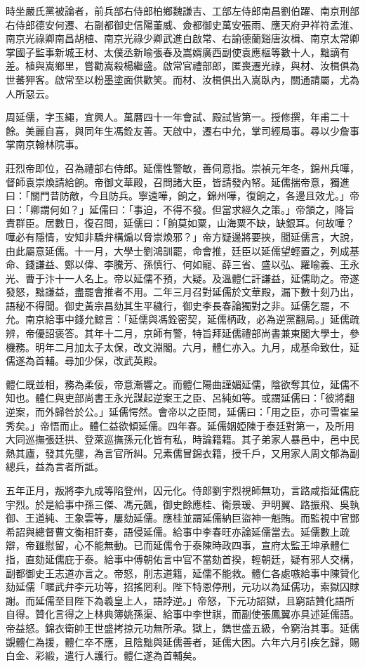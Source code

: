 \begin{pinyinscope}
時坐嚴氏黨被論者，前兵部右侍郎柏鄉魏謙吉、工部左侍郎南昌劉伯躍、南京刑部右侍郎德安何遷、右副都御史信陽董威、僉都御史萬安張雨、應天府尹祥符孟淮、南京光祿卿南昌胡植、南京光祿少卿武進白啟常、右諭德蘭谿唐汝楫、南京太常卿掌國子監事新城王材、太僕丞新喻張春及嵩婿廣西副使袁應樞等數十人，黜謫有差。植與嵩鄉里，嘗勸嵩殺楊繼盛。啟常官禮部郎，匿喪遷光祿，與材、汝楫俱為世蕃狎客。啟常至以粉墨塗面供歡笑。而材、汝楫俱出入嵩臥內，關通請屬，尤為人所惡云。

周延儒，字玉繩，宜興人。萬曆四十一年會試、殿試皆第一。授修撰，年甫二十餘。美麗自喜，與同年生馮銓友善。天啟中，遷右中允，掌司經局事。尋以少詹事掌南京翰林院事。

莊烈帝即位，召為禮部右侍郎。延儒性警敏，善伺意指。崇禎元年冬，錦州兵嘩，督師袁崇煥請給餉。帝御文華殿，召問諸大臣，皆請發內帑。延儒揣帝意，獨進曰：「關門昔防敵，今且防兵。寧遠嘩，餉之，錦州嘩，復餉之，各邊且效尤。」帝曰：「卿謂何如？」延儒曰：「事迫，不得不發。但當求經久之策。」帝頷之，降旨責群臣。居數日，復召問，延儒曰：「餉莫如粟，山海粟不缺，缺銀耳。何故嘩？嘩必有隱情，安知非驕弁構煽以脅崇煥邪？」帝方疑邊將要挾，聞延儒言，大說，由此屬意延儒。十一月，大學士劉鴻訓罷，命會推，廷臣以延儒望輕置之，列成基命、錢謙益、鄭以偉、李騰芳、孫慎行、何如寵、薛三省、盛以弘、羅喻義、王永光、曹于汴十一人名上。帝以延儒不預，大疑。及溫體仁訐謙益，延儒助之。帝遂發怒，黜謙益，盡罷會推者不用。二年三月召對延儒於文華殿，漏下數十刻乃出，語秘不得聞。御史黃宗昌劾其生平穢行，御史李長春論獨對之非。延儒乞罷，不允。南京給事中錢允鯨言：「延儒與馮銓密契，延儒柄政，必為逆黨翻局。」延儒疏辨，帝優詔褒答。其年十二月，京師有警，特旨拜延儒禮部尚書兼東閣大學士，參機務。明年二月加太子太保，改文淵閣。六月，體仁亦入。九月，成基命致仕，延儒遂為首輔。尋加少保，改武英殿。

體仁既並相，務為柔佞，帝意漸響之。而體仁陽曲謹媚延儒，陰欲奪其位，延儒不知也。體仁與吏部尚書王永光謀起逆案王之臣、呂純如等。或謂延儒曰：「彼將翻逆案，而外歸咎於公。」延儒愕然。會帝以之臣問，延儒曰：「用之臣，亦可雪崔呈秀矣。」帝悟而止。體仁益欲傾延儒。四年春。延儒姻婭陳于泰廷對第一，及所用大同巡撫張廷拱、登萊巡撫孫元化皆有私，時論籍籍。其子弟家人暴邑中，邑中民熱其廬，發其先壟，為言官所糾。兄素儒冒錦衣籍，授千戶，又用家人周文郁為副總兵，益為言者所詆。

五年正月，叛將李九成等陷登州，囚元化。侍郎劉宇烈視師無功，言路咸指延儒庇宇烈。於是給事中孫三傑、馮元飆，御史餘應桂、衛景瑗、尹明翼、路振飛、吳執御、王道純、王象雲等，屢劾延儒。應桂並謂延儒納巨盜神一魁賄。而監視中官鄧希詔與總督曹文衡相訐奏，語侵延儒。給事中李春旺亦論延儒當去。延儒數上疏辯，帝雖慰留，心不能無動。已而延儒令于泰陳時政四事，宣府太監王坤承體仁指，直劾延儒庇于泰。給事中傅朝佑言中官不當劾首揆，輕朝廷，疑有邪人交構，副都御史王志道亦言之。帝怒，削志道籍，延儒不能救。體仁各處嗾給事中陳贊化劾延儒「暱武弁李元功等，招搖罔利。陛下特恩停刑，元功以為延儒功，索獄囚賕謝。而延儒至目陛下為羲皇上人，語誖逆。」帝怒，下元功詔獄，且窮詰贊化語所自得。贊化言得之上林典簿姚孫渠、給事中李世祺，而副使張鳳翼亦具述延儒語。帝益怒。錦衣衛帥王世盛拷掠元功無所承。獄上，鐫世盛五級，令窮治其事。延儒覬體仁為援，體仁卒不應，且陰黜與延儒善者，延儒大困。六年六月引疾乞歸，賜白金、彩緞，遣行人護行。體仁遂為首輔矣。


\end{pinyinscope}
